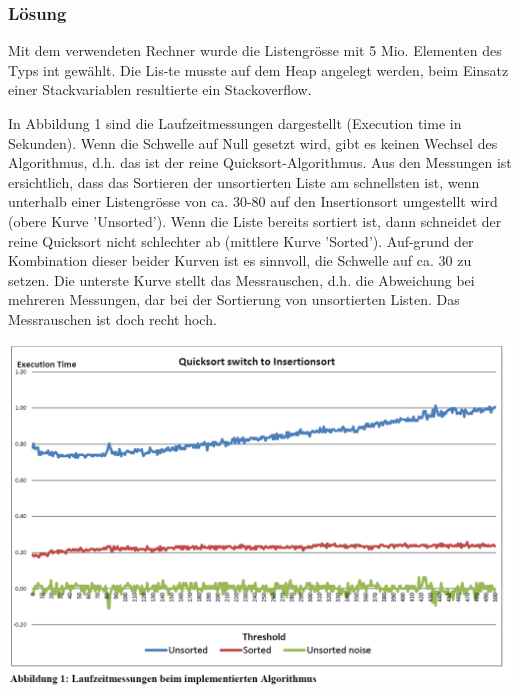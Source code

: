 \subsubsection{Lösung}

Mit dem verwendeten Rechner wurde die Listengrösse mit 5 Mio. Elementen des Typs int gewählt. Die Lis-te musste auf dem Heap angelegt werden, beim Einsatz einer Stackvariablen resultierte ein Stackoverflow.

In Abbildung 1 sind die Laufzeitmessungen dargestellt (Execution time in Sekunden). Wenn die Schwelle auf Null gesetzt wird, gibt es keinen Wechsel des Algorithmus, d.h. das ist der reine Quicksort-Algorithmus. Aus den Messungen ist ersichtlich, dass das Sortieren der unsortierten Liste am schnellsten ist, wenn unterhalb einer Listengrösse von ca. 30-80 auf den Insertionsort umgestellt wird (obere Kurve 'Unsorted'). Wenn die Liste bereits sortiert ist, dann schneidet der reine Quicksort nicht schlechter ab (mittlere Kurve 'Sorted'). Auf-grund der Kombination dieser beider Kurven ist es sinnvoll, die Schwelle auf ca. 30 zu setzen.
Die unterste Kurve stellt das Messrauschen, d.h. die Abweichung bei mehreren Messungen, dar bei der Sortierung von unsortierten Listen. Das Messrauschen ist doch recht hoch.

\includegraphics[width=.8\linewidth]{900-Praktika/prak03/pic.PNG}



\noindent\makebox[\linewidth]{\rule{\paperwidth}{0.4pt}}

\noindent\makebox[\linewidth]{\rule{\paperwidth}{0.4pt}}

\noindent\makebox[\linewidth]{\rule{\paperwidth}{0.4pt}}

\noindent\makebox[\linewidth]{\rule{\paperwidth}{0.4pt}}

\noindent\makebox[\linewidth]{\rule{\paperwidth}{0.4pt}}
